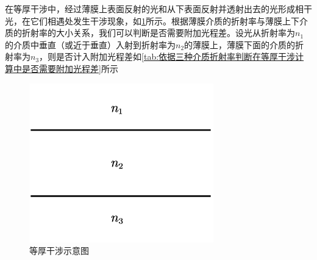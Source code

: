 \documentclass[12pt, a4paper, twoside]{ctexbook}
\begin{document}
在等厚干涉中，经过薄膜上表面反射的光和从下表面反射并透射出去的光形成相干光，在它们相遇处发生干涉现象，如\textcolor{blue}{\cref{fig:等厚干涉示意}}所示。根据薄膜介质的折射率与薄膜上下介质的折射率的大小关系，我们可以判断是否需要附加光程差。设光从折射率为$n_1$的介质中垂直（或近于垂直）入射到折射率为$n_2$的薄膜上，薄膜下面的介质的折射率为$n_3$，则是否计入附加光程差如\textcolor{blue}{\cref{tab:依据三种介质折射率判断在等厚干涉计算中是否需要附加光程差}}所示
\begin{figure}[H]
    \centerline{\includegraphics[scale=0.88]{等厚干涉示意.pdf}}
    \caption{等厚干涉示意图}\label{fig:等厚干涉示意}
\end{figure}


\begin{table}[H]
    \centering
    \caption{依据三种介质折射率判断在等厚干涉计算中是否需要附加光程差}
    \label{tab:依据三种介质折射率判断在等厚干涉计算中是否需要附加光程差}
\end{table}
\end{document}
